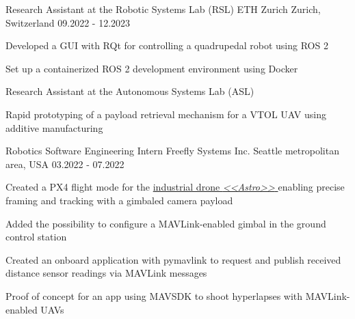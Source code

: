 

\begin{cventries}

  \cventry
    {Research Assistant at the Robotic Systems Lab (RSL)} %
    {ETH Zurich} %
    {Zurich, Switzerland} %
    {09.2022 - 12.2023} %
    {
      \begin{cvitems}
        \item Developed a GUI with RQt for controlling a quadrupedal robot using ROS 2
        \item Set up a containerized ROS 2 development environment using Docker
      \end{cvitems}
    }

  \cventry
    {Research Assistant at the Autonomous Systems Lab (ASL)} %
    {} %
    {} %
    {} %
    {
      \begin{cvitems}
        \item Rapid prototyping of a payload retrieval mechanism for a VTOL UAV using additive manufacturing
      \end{cvitems}
    }

  \cventry
    {Robotics Software Engineering Intern} %
    {Freefly Systems Inc.} %
    {Seattle metropolitan area, USA} %
    {03.2022 - 07.2022} %
    {
      \begin{cvitems}
        \item Created a PX4 flight mode for the \href{https://freeflysystems.com/astro}{industrial drone \textit{<<Astro>>} \ExternalLink} enabling precise framing and tracking with a gimbaled camera payload
        \item Added the possibility to configure a MAVLink-enabled gimbal in the ground control station
        \item Created an onboard application with pymavlink to request and publish received distance sensor readings via MAVLink messages
        \item Proof of concept for an app using MAVSDK to shoot hyperlapses with MAVLink-enabled UAVs
      \end{cvitems}
    }


\end{cventries}

